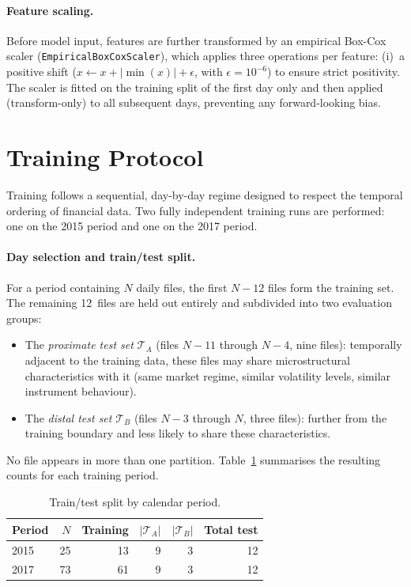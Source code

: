 \documentclass[11pt]{report}
\begin{document}
\paragraph{Feature scaling.}
Before model input, features are further transformed by an empirical Box-Cox scaler (\texttt{EmpiricalBoxCoxScaler}), which applies three operations per feature: (i)~a positive shift ($x \leftarrow x + |\min(x)| + \epsilon$, with $\epsilon = 10^{-6}$) to ensure strict positivity. The scaler is fitted on the training split of the first day only and then applied (transform-only) to all subsequent days, preventing any forward-looking bias.


\section{Training Protocol}\label{sec:data:training}

Training follows a sequential, day-by-day regime designed to respect the temporal ordering of financial data. Two fully independent training runs are performed: one on the 2015 period and one on the 2017 period.

\paragraph{Day selection and train/test split.}
For a period containing $N$ daily files, the first $N - 12$ files form the training set. The remaining 12~files are held out entirely and subdivided into two evaluation groups:
\begin{itemize}
  \item The \emph{proximate test set} $\mathcal{T}_A$ (files $N{-}11$ through $N{-}4$, nine files): temporally adjacent to the training data, these files may share microstructural characteristics with it (same market regime, similar volatility levels, similar instrument behaviour).
  \item The \emph{distal test set} $\mathcal{T}_B$ (files $N{-}3$ through $N$, three files): further from the training boundary and less likely to share these characteristics.
\end{itemize}
No file appears in more than one partition. Table~\ref{tab:split} summarises the resulting counts for each training period.

\begin{table}[H]
\centering
\caption{Train/test split by calendar period.}\label{tab:split}
\begin{tabular}{lrrrrr}
\toprule
\textbf{Period} & $N$ & \textbf{Training} & $|\mathcal{T}_A|$ & $|\mathcal{T}_B|$ & \textbf{Total test} \\
\midrule
2015 & 25 & 13 & 9 & 3 & 12 \\
2017 & 73 & 61 & 9 & 3 & 12 \\
\bottomrule
\end{tabular}
\end{table}
\end{document}
